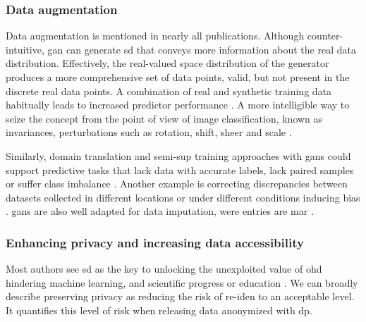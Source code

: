        \subsubsection{Data augmentation}\label{sec:augmentation}
    
            Data augmentation  is mentioned in nearly all publications. Although counter-intuitive, \gls{gan} can generate \gls{sd} that conveys more information about the real data distribution. Effectively, the real-valued space distribution of the generator produces a more comprehensive set of data points, valid, but not present in the discrete real data points. A combination of real and synthetic training data habitually leads to increased predictor performance \cite{Wang_2019,Che_2017,Yoon2018-ite, yoon2018imputation, Yang_2019_impute_ehr, Chen_2019, cui2019conan, Che_2017}. A more intelligible way to seize the concept from the point of view of image classification, known as invariances, perturbations such as rotation, shift, sheer and scale \cite{antoniou2017data}.\par 
            
            Similarly, domain translation  and \gls{semi-sup} training approaches with \glspl{gan} could support predictive tasks that lack data with accurate labels, lack paired samples or suffer class imbalance \cite{Che_2017,mcdermott2018semi, Yoon2018-ite}. Another example is correcting discrepancies between datasets collected in different locations or under different conditions inducing bias \cite{Yoon2018-radial}. \glspl{gan} are also well adapted for data imputation, were  entries are \gls{mar} \cite{yoon2018imputation}. 

        \subsubsection{Enhancing privacy and increasing data accessibility}\label{sec:access_privacy}
    
            Most authors see \gls{sd} as the key to unlocking the unexploited value of \gls{ohd} hindering machine learning, and scientific progress \cite{Beaulieu-Jones2019-ct, baowaly_2019_IEEE,baowaly_2019_jamia,Che_2017,esteban2017real,Fisher2019,severo2019ward2icu} or education \cite{laderas_teaching_2018}. We can broadly describe preserving privacy as reducing the risk of \gls{re-iden} to an acceptable level. It quantifies this level of risk when releasing data anonymized with \gls{dp}.\par
    
